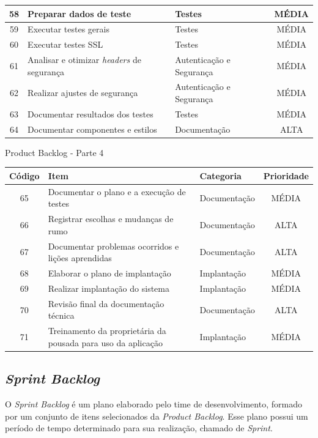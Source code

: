 \documentclass[
	12pt,				%
	openany,			%
	twoside,			%
	a4paper,			%
	english,			%
	french,				%
	spanish,			%
	brazil				%
	]{abntex2}
\begin{document}
\begin{quadro}[H]
\begin{tabular}{|c|p{6.5cm}|p{3.8cm}|c|}
	     	58 & Preparar dados de teste & Testes &	MÉDIA \\ \hline
	     	59 & Executar testes gerais & Testes & MÉDIA \\ \hline
	     	60 & Executar testes SSL & Testes &	MÉDIA \\ \hline
	     	61 & Analisar e otimizar \textit {headers} de segurança &
	     	Autenticação e Segurança &	MÉDIA \\ \hline	
	     	62 & Realizar ajustes de segurança & Autenticação e Segurança
	     	& MÉDIA \\ \hline
	     	63 & Documentar resultados dos testes &	Testes & MÉDIA \\ \hline
	     	64 & Documentar componentes e estilos & Documentação &
	     	ALTA \\ \hline
     	\end{tabular}
     		\end{quadro}

 \begin{quadro}[H]
	\caption{Product Backlog - Parte 4}
	\label{product_backlog_4}
	\begin{tabular}{|c|p{6.5cm}|p{3.8cm}|c|}
		\hline
		\textbf{Código} & \textbf{Item} & \textbf{Categoria} & \textbf{Prioridade} \\	\hline
		   65 & Documentar o plano e a execução de testes & Documentação &
		   MÉDIA \\ \hline
		   66 & Registrar escolhas e mudanças de rumo & Documentação &
		   ALTA \\ \hline
		   67 & Documentar problemas ocorridos e lições aprendidas &
		   Documentação & ALTA \\ \hline
		   68 & Elaborar o plano de implantação & Implantação & 
		   MÉDIA \\ \hline
		   69 & Realizar implantação do sistema & Implantação & MÉDIA \\ \hline
		   70 & Revisão final da documentação técnica & Documentação &
		   ALTA \\ \hline
		   71 & Treinamento da proprietária da pousada para uso da aplicação &	Implantação & MÉDIA \\ \hline
   \end{tabular}
\end{quadro}
\subsection{\textit{Sprint Backlog}}
O \textit{Sprint Backlog} é um plano elaborado pelo time de desenvolvimento, formado por um conjunto de itens selecionados da \textit {Product Backlog}. Esse plano possui um período de tempo determinado para sua realização, chamado de \textit {Sprint}. 
\end{document}
